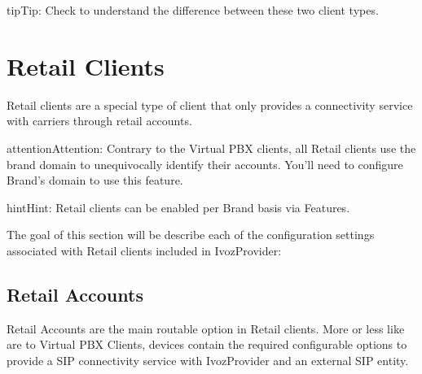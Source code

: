 \documentclass[letterpaper,10pt,english]{sphinxmanual}
\begin{document}
\begin{notice}{tip}{Tip:}
Check {\hyperref[administration_portal/brand/clients/retail:differences\string-between\string-retail\string-and\string-residential\string-clients]{}} to understand the difference between these two
client types.
\end{notice}
\label{administration_portal/client/retail/index:retail-clients}

\section{Retail Clients}
\label{administration_portal/client/retail/index:retail-clients}\label{administration_portal/client/retail/index:clientes-retail}\label{administration_portal/client/retail/index::doc}\label{administration_portal/client/retail/index:id1}
Retail clients are a special type of client that only provides a connectivity
service with carriers through retail accounts.

\begin{notice}{attention}{Attention:}
Contrary to the Virtual PBX clients, all Retail clients use the
brand domain to unequivocally identify their accounts. You'll need to configure
Brand's domain to use this feature.
\end{notice}

\begin{notice}{hint}{Hint:}
Retail clients can be enabled per Brand basis via Features.
\end{notice}

The goal of this section will be describe each of the configuration settings
associated with Retail clients included in IvozProvider:


\subsection{Retail Accounts}
\label{administration_portal/client/retail/retail_accounts::doc}\label{administration_portal/client/retail/retail_accounts:retail-accounts}\label{administration_portal/client/retail/retail_accounts:id1}
Retail Accounts are the main routable option in Retail clients.
More or less like {\hyperref[administration_portal/client/vpbx/routing_endpoints/friends/index:friends]{}} are to Virtual PBX Clients, devices
contain the required configurable options to provide a SIP connectivity
service with IvozProvider and an external SIP entity.
\end{document}
